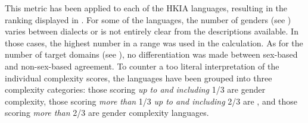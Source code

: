 \documentclass[output=collectionpaper]{langsci/langscibook}
\begin{document}
This metric has been applied to each of the HKIA languages, resulting in the ranking displayed in . For some of the languages, the number of genders (see ) varies between dialects or is not entirely clear from the descriptions available. In those cases, the highest number in a range was used in the calculation. As for the number of target domains (see ), no differentiation was made between sex-based and non-sex-based agreement. To counter a too literal interpretation of the individual complexity scores, the languages have been grouped into three complexity categories: those scoring \emph{up to and including} 1/3 are  gender complexity, those scoring \emph{more than} 1/3 \emph{up to and including} 2/3 are , and those scoring \emph{more than} 2/3 are  gender complexity languages.
\end{document}
